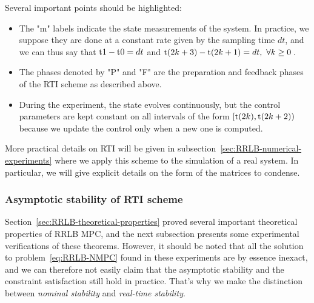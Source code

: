 \documentclass[12pt]{article}
\begin{document}
\noindent Several important points should be highlighted:

\begin{itemize}[label=\textbullet]

	\item The "\color{green}m\color{black}" labels indicate the state measurements of the system.
	In practice, we suppose they are done at a constant rate given by the sampling time $dt$, and we can thus say that $\rm{t}1-\rm{t}0=dt$ and $\rm{t}(2k+3)-\rm{t}(2k+1)=dt,~\forall k\geq 0$\,.

	\item The phases denoted by "\color{red}P\color{black}" and "\color{blue}F\color{black}" are the preparation and feedback phases of the RTI scheme as described above.

	\item During the experiment, the state evolves continuously, but the control parameters are kept constant on all intervals of the form $[\rm{t}(2k),\rm{t}(2k+2))$ because we update the control only when a new one is computed.
\end{itemize}

More practical details on RTI will be given in subsection~\ref{sec:RRLB-numerical-experiments} where we apply this scheme to the simulation of a real system.
In particular, we will give explicit details on the form of the matrices to condense.

\subsubsection{Asymptotic stability of RTI scheme}\label{sec:RRLB-real-time-stability}

Section~\ref{sec:RRLB-theoretical-properties} proved several important theoretical properties of RRLB MPC, and the next subsection presents some experimental verifications of these theorems.
However, it should be noted that all the solution to problem~\ref{eq:RRLB-NMPC} found in these experiments are by essence inexact, and we can therefore not easily claim that the asymptotic stability and the constraint satisfaction still hold in practice. That's why we make the distinction between \textit{nominal stability} and \textit{real-time stability}.
\end{document}
